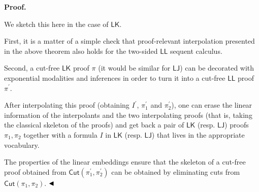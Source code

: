 \documentclass[10pt,a4paper]{article}
\begin{document}
 
 
 
\par\medskip\noindent\textbf{Proof.}\par
 
 
We sketch this here in the case of $\mathsf{LK}$.\par
 
 
 
First, it is a matter of a simple check that proof-relevant interpolation presented in the above theorem also holds for the two-sided $\mathsf{LL}$ sequent calculus.\par
 
 
 
Second, a cut-free $\mathsf{LK}$ proof $\pi$ (it would be similar for $\mathsf{LJ}$) can be decorated with exponential modalities and inferences in order to turn it into a cut-free $\mathsf{LL}$ proof $\pi^{\prime}$.\par
 
 
 
After interpolating this proof (obtaining $I^{\prime}$, $\pi^{\prime}_{1}$ and $\pi^{\prime}_{2}$), one can erase the linear information of the interpolants and the two interpolating proofs (that is, taking the classical skeleton of the proofs) and get back a pair of $\mathsf{LK}$ (resp. $\mathsf{LJ}$) proofs $\pi_{1},\pi_{2}$ together with a formula $I$ in $\mathsf{LK}$ (resp. $\mathsf{LJ}$) that lives in the appropriate vocabulary.\par
 
 
 
The properties of the linear embeddings ensure that the skeleton of a cut-free proof obtained from $\mathsf{Cut}(\pi^{\prime}_{1},\pi^{\prime}_{2})$ can be obtained by eliminating cuts from $\mathsf{Cut}(\pi_{1},\pi_{2})$. $\hfill\blacktriangleleft$\par
 
 
\end{document}
